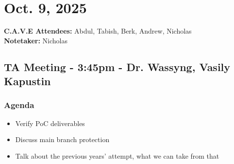 	\pagebreak
	\section*{Oct. 9, 2025}

	\textbf{C.A.V.E Attendees:} Abdul, Tabish, Berk, Andrew, Nicholas\\
	\textbf{Notetaker:} Nicholas

	\subsection*{TA Meeting - 3:45pm - Dr. Wassyng, Vasily Kapustin}
		\subsubsection*{Agenda}
			\begin{itemize}
				\item Verify PoC deliverables
				\item Discuss main branch protection
				\item Talk about the previous years' attempt, what we can take from that
			\end{itemize}

